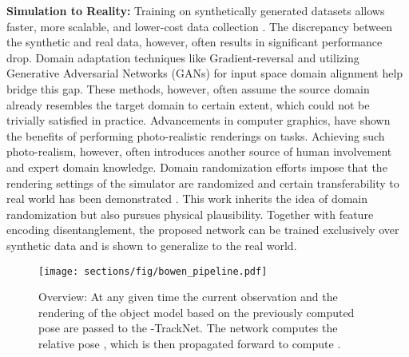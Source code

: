 \documentclass[letterpaper, 10 pt, conference]{ieeeconf}
\begin{document}
\noindent \textbf{Simulation to Reality:} Training on synthetically generated datasets allows faster, more scalable, and lower-cost data collection \cite{tobin2017domain}. The
discrepancy between the synthetic and real
data, however, often results in significant performance drop. Domain adaptation
techniques like Gradient-reversal \cite{ganin2014unsupervised} and
utilizing Generative Adversarial Networks (GANs) for input space
domain alignment \cite{shrivastava2017learning} help bridge this
gap. These methods, however, often assume the source domain already
resembles the target domain to certain extent, which could not be
trivially satisfied in practice. Advancements in computer graphics, \cite{yosinski2014transferable,movshovitz2016useful}
have shown the
benefits of performing photo-realistic renderings on tasks. Achieving such photo-realism, however, often introduces another source of
human involvement and expert domain knowledge.  Domain randomization efforts impose that the rendering settings of the simulator are randomized and certain transferability to real world has been demonstrated \cite{tobin2017domain}. This work inherits the idea of domain randomization but also pursues physical plausibility. Together with feature encoding disentanglement, the proposed network can be trained exclusively over synthetic data and is shown to generalize to the real world.

\begin{figure}[h]
  \centering
  \texttt{[image: sections/fig/bowen\_pipeline.pdf]}
  \vspace{-.3in}
  \caption{Overview: At any given time  the current observation  and the rendering  of the object model based on the previously computed pose  are passed to the -TrackNet. The network computes the relative pose , which is then propagated forward to compute .}
  \label{fig:overview}
\end{figure}
 
\end{document}
